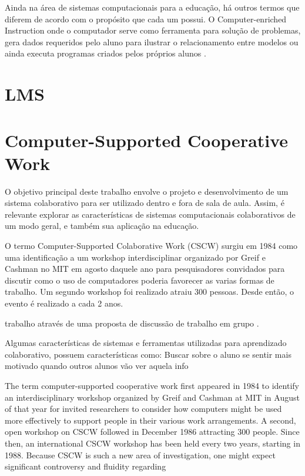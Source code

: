 Ainda na área de sistemas computacionais para a educação, há outros termos que diferem de acordo com o propósito que cada um possui. O Computer-enriched Instruction onde o computador serve como ferramenta para solução de problemas, gera dados requeridos pelo aluno para ilustrar o relacionamento entre modelos ou ainda executa programas criados pelos próprios alunos \cite{wheres98, cotton91}.

\section{LMS}

\section{Computer-Supported Cooperative Work}

O objetivo principal deste trabalho envolve o projeto e desenvolvimento de um sistema colaborativo para ser utilizado dentro e fora de sala de aula. Assim, é relevante explorar as características de sistemas computacionais colaborativos de um modo geral, e também sua aplicação na educação.

O termo Computer-Supported Colaborative Work (CSCW) surgiu em 1984 como uma identificação a um workshop interdisciplinar organizado por Greif e Cashman no MIT em agosto daquele ano para pesquisadores convidados para discutir como o uso de computadores poderia favorecer as varias formas de trabalho. Um segundo workshop foi realizado atraiu 300 pessoas. Desde então, o evento é realizado a cada 2 anos.

 trabalho através de uma proposta de discussão de trabalho em grupo \cite{greif1988}.


Algumas características de sistemas e ferramentas utilizadas para aprendizado colaborativo, possuem características como:
Buscar sobre o aluno se sentir mais motivado quando outros alunos vão ver aquela info

The term computer-supported cooperative work first appeared
in 1984 to identify an interdisciplinary workshop
organized by Greif and Cashman at MIT in August of
that year for invited researchers to consider how computers
might be used more effectively to support people
in their various work arrangements. A second, open workshop
on CSCW followed in December 1986 attracting
300 people. Since then, an international CSCW workshop
has been held every two years, starting in 1988.
Because CSCW is such a new area of investigation, one
might expect significant controversy and fluidity regarding

